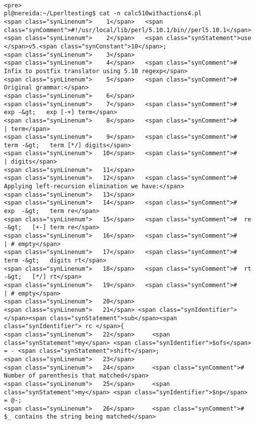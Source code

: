 \begin{verbatim}

<pre>
pl@nereida:~/Lperltesting$ cat -n calc510withactions4.pl
<span class="synLinenum">    1</span>   <span class="synComment">#!/usr/local/lib/perl/5.10.1/bin//perl5.10.1</span>
<span class="synLinenum">    2</span>   <span class="synStatement">use </span>v5.<span class="synConstant">10</span>;
<span class="synLinenum">    3</span> 
<span class="synLinenum">    4</span>   <span class="synComment"># Infix to postfix translator using 5.10 regexp</span>
<span class="synLinenum">    5</span>   <span class="synComment"># Original grammar:</span>
<span class="synLinenum">    6</span> 
<span class="synLinenum">    7</span>   <span class="synComment">#  exp -&gt;   exp [-+] term</span>
<span class="synLinenum">    8</span>   <span class="synComment">#         | term</span>
<span class="synLinenum">    9</span>   <span class="synComment">#  term -&gt;   term [*/] digits</span>
<span class="synLinenum">   10</span>   <span class="synComment">#          | digits</span>
<span class="synLinenum">   11</span> 
<span class="synLinenum">   12</span>   <span class="synComment"># Applying left-recursion elimination we have:</span>
<span class="synLinenum">   13</span> 
<span class="synLinenum">   14</span>   <span class="synComment">#  exp  -&gt;   term re</span>
<span class="synLinenum">   15</span>   <span class="synComment">#  re   -&gt;   [+-] term re</span>
<span class="synLinenum">   16</span>   <span class="synComment">#          | # empty</span>
<span class="synLinenum">   17</span>   <span class="synComment">#  term -&gt;   digits rt</span>
<span class="synLinenum">   18</span>   <span class="synComment">#  rt   -&gt;   [*/] rt</span>
<span class="synLinenum">   19</span>   <span class="synComment">#          | # empty</span>
<span class="synLinenum">   20</span> 
<span class="synLinenum">   21</span> <span class="synIdentifier">  </span><span class="synStatement">sub</span><span class="synIdentifier"> rc </span>{
<span class="synLinenum">   22</span>     <span class="synStatement">my</span> <span class="synIdentifier">$ofs</span> = - <span class="synStatement">shift</span>;
<span class="synLinenum">   23</span> 
<span class="synLinenum">   24</span>     <span class="synComment"># Number of parenthesis that matched</span>
<span class="synLinenum">   25</span>     <span class="synStatement">my</span> <span class="synIdentifier">$np</span> = @-;
<span class="synLinenum">   26</span>     <span class="synComment"># $_ contains the string being matched</span>

\end{verbatim}
